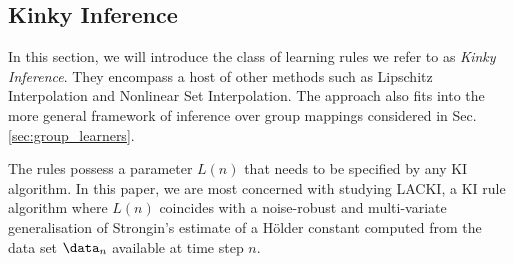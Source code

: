 



\subsection{Kinky Inference}
\label{sec:KI_core}
In this section, we will introduce the class of learning rules we refer to as \emph{Kinky Inference}. They encompass a host of other methods such as Lipschitz Interpolation and Nonlinear Set Interpolation.  The approach also fits into the more general framework of inference over group mappings considered in Sec. \ref{sec:group_learners}. 
%

The rules possess a parameter $L(n)$ that needs to be specified by any KI algorithm. In this paper, we are most concerned with studying LACKI, a KI rule algorithm where $L(n)$ coincides with a noise-robust and multi-variate generalisation of Strongin's estimate \cite{Strongin1973} of a H\"older constant computed from the data set $\data_n$ available at time step $n$. 


